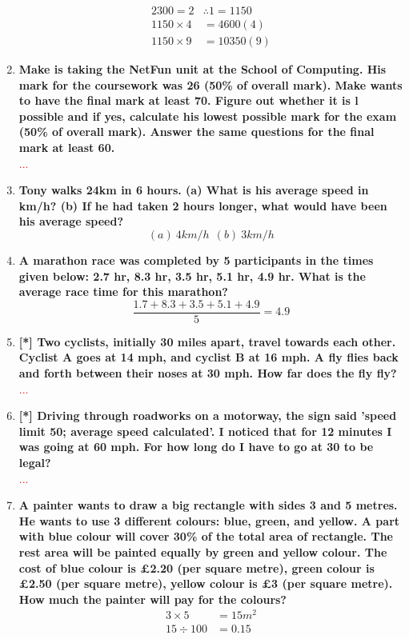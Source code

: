 \begin{enumerate}
    \begin{align*}
        2300=2&\therefore 1=1150\\
        1150\times 4 &= 4600 (4)\\
        1150\times9 &= 10350 (9)
    \end{align*}
    \item \textbf{Make is taking the NetFun unit at the School of Computing. His mark for the coursework was 26 (50\% of overall mark). Make wants to have the final mark at least 70. Figure out whether it is l possible and if yes, calculate his lowest possible mark for the exam (50\% of overall mark). Answer the same questions for the final mark at least 60.}\\
    \textcolor{red}{...}
    \item \textbf{Tony walks 24km in 6 hours. (a) What is his average speed in km/h? (b) If he had taken 2 hours longer, what would have been his average speed?}
    \[(a)\ 4km/h\ \  (b)\ 3km/h\]
    \item \textbf{A marathon race was completed by 5 participants in the times given below: 2.7 hr, 8.3 hr, 3.5 hr, 5.1 hr, 4.9 hr. What is the average race time for this marathon?}
    \[ \frac{1.7 + 8.3 + 3.5 + 5.1 + 4.9}{5} = 4.9\]
    \item \textbf{[*] Two cyclists, initially 30 miles apart, travel towards each other. Cyclist A goes at 14 mph, and cyclist B at 16 mph. A fly flies back and forth between their noses at 30 mph. How far does the fly fly?}\\
    \textcolor{red}{...}
    \item \textbf{[*] Driving through roadworks on a motorway, the sign said 'speed limit 50; average speed calculated'. I noticed that for 12 minutes I was going at 60 mph. For how long do I have to go at 30 to be legal?}\\
    \textcolor{red}{...}
    \item \textbf{A painter wants to draw a big rectangle with sides 3 and 5 metres. He wants to use 3 different colours: blue, green, and yellow. A part with blue colour will cover 30\% of the total area of rectangle. The rest area will be painted equally by green and yellow colour. The cost of blue colour is £2.20 (per square metre), green colour is £2.50 (per square metre), yellow colour is £3 (per square metre). How much the painter will pay for the colours?}
    \begin{align*}
        3\times5 &= 15m^2\\
        15 \div 100 &= 0.15\\

\end{align*}
\end{enumerate}
